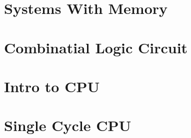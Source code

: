 \documentclass[en,11pt,english,black,simple,device=ppt]{elegantbook}
\begin{document}
\section{Systems With Memory}



\section{Combinatial Logic Circuit}





\section{Intro to CPU}




\section{Single Cycle CPU}


\end{document}
